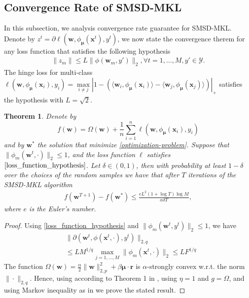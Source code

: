 \documentclass{article}
\newtheorem{theorem}{Theorem}
\begin{document}
\subsection{Convergence Rate of SMSD-MKL}
In this subsection, we analysis convergence rate guarantee for SMSD-MKL.
Denote by $z^t=\partial\ell(\mathbf w,\phi_{\bm \mu}(\mathbf{x}^t), y^t)$,
we now state the convergence therem for any loss function that satisfies the following hypothesis
\begin{align}
\label{loss_function_hypothesis}
    \|z_m\| \leq L\|\phi(\mathbf w_m, y')\|_2, \forall t =1,\ldots, M, y' \in \mathcal{Y}.
\end{align}
The hinge loss for multi-class $\ell(\mathbf w,\phi_{\bm \mu}(\mathbf{x}_i), y_i)=
\max\limits_{i \not= j}\left|1-\left(\langle\mathbf w_i, \phi_{\bm \mu}(\mathbf{x}_i)\rangle -\langle\mathbf w_j, \phi_{\bm \mu}(\mathbf{x}_j)\rangle\right)\right|_+$ satisfies the hypothesis with $L=\sqrt{2}$.

\begin{theorem}
Denote by $$f(\mathbf w)=\Omega(\mathbf w)+\frac{1}{n}\sum_{i=1}^n\ell(\mathbf w,\phi_{\bm \mu}(\mathbf{x}_i),y_i)$$
and by $\mathbf w^\ast$ the solution that minimize \eqref{optimization-problem}.
Suppose that $\|\phi_m(\mathbf w^t,\cdot)\|_2 \leq 1$, and the loss function $\ell$ satisfies $\eqref{loss_function_hypothesis}$.
Let $\delta \in (0,1)$, then with probability at least $1 - \delta$ over the choices of the random samples
we have that after $T$ iterations of the SMSD-MKL algorithm
\begin{align*}
    f(\mathbf w^{T+1})-f(\mathbf w^\ast) \leq \frac{eL^2(1+\log T)\log M}{\alpha\delta T},
\end{align*}
where $e$ is the Euler's number.
\end{theorem}
\begin{proof}
Using \eqref{loss_function_hypothesis} and $\|\phi_m(\mathbf w^t, y^t)\|_2 \leq 1$, we have
\begin{align*}
    &\|\partial(\mathbf w^t,\phi(\mathbf{x}^t,\cdot), y^t)\|_{2,q} \\
    &\leq LM^{1/q} \max_{j=1, \ldots, M} \|\phi_m(\mathbf{x}^t, \cdot)\|_2 \leq LF^{1/q}
\end{align*}
The function $\Omega(\mathbf w)=\frac{\alpha}{2}\|\mathbf w\|_{2,p}^2 + \beta\mathbf{\mu} \cdot \mathbf{r}$ is
 $\alpha$-strongly convex w.r.t. the norm $\|\cdot\|_{2,q}$. Hence, using according to Theorem 1 in \cite{Shalev-ShwartzSS07},
 using $\eta=1$ and $g=\Omega$, and using Markov inequality as in \cite{Shalev-ShwartzSS07} we prove the stated result.
\end{proof}
\end{document}
